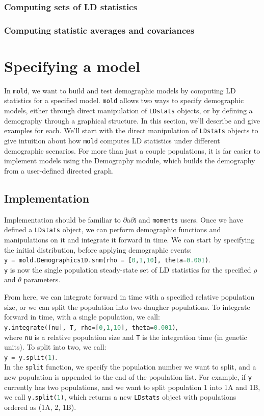 \documentclass[10pt]{article}
\makeatletter
\newcommand{\dadi}{$\partial$a$\partial$i\xspace}
\newcommand{\mold}{\texttt{mold}\xspace}
\newcommand{\py}[1]{\lstinline[breaklines=true,language=Python, showstringspaces=False]@#1@}
\makeatother
\begin{document}
\subsubsection{Computing sets of LD statistics}
\subsubsection{Computing statistic averages and covariances}

\section{Specifying a model}

In \mold, we want to build and test demographic models by computing LD statistics for a specified model.
\mold allows two ways to specify demographic models, either through direct manipulation of \py{LDstats} objects, or by defining a demography through a graphical structure.
In this section, we'll describe and give examples for each.
We'll start with the direct manipulation of \py{LDstats} objects to give intuition about how \mold computes LD statistics under different demographic scenarios.
For more than just a couple populations, it is far easier to implement models using the Demography module, which builds the demography from a user-defined directed graph.

\subsection{Implementation}

Implementation should be familiar to \dadi and \py{moments} users.
Once we have defined a \py{LDstats} object, we can perform demographic functions and manipulations on it and integrate it forward in time.
We can start by specifying the initial distribution, before applying demographic events:\\
\py{y = mold.Demographics1D.snm(rho = [0,1,10], theta=0.001)}.\\
\py{y} is now the single population steady-state set of LD statistics for the specified $\rho$ and $\theta$ parameters.

From here, we can integrate forward in time with a specified relative population size, or we can split the population into two daugher populations.
To integrate forward in time, with a single population, we call:\\
\py{y.integrate([nu], T, rho=[0,1,10], theta=0.001)},\\
where \py{nu} is a relative population size and \py{T} is the integration time (in genetic units).
To split into two, we call:\\
\py{y = y.split(1)}.\\
In the \py{split} function, we specify the population number we want to split, and a new population is appended to the end of the population list.
For example, if \py{y} currently has two populations, and we want to split population 1 into 1A and 1B, we call \py{y.split(1)}, which returns a new \py{LDstats} object with populations ordered as (1A, 2, 1B).
\end{document}
